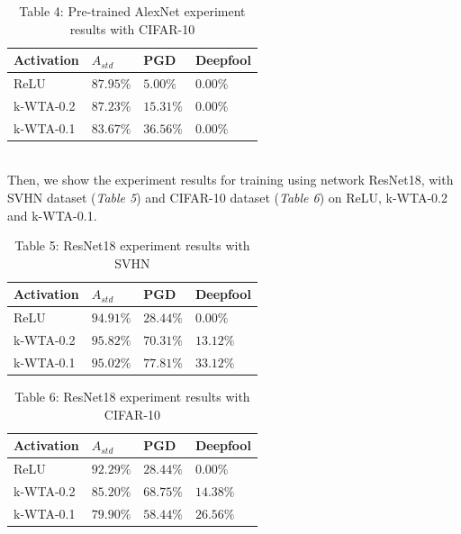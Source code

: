 \documentclass[a4paper]{article}
\begin{document}
	\begin{table}[!htbp]
		\begin{tabular}{|p{}|p{}|p{}|p{}|}
			\hline
			Activation	& $A_{std}$	&	PGD	&	Deepfool	\\
			\hline
			ReLU		&$87.95\%$&$5.00\%$&$0.00\%$	\\
			\hline
			k-WTA-0.2	&$87.23\%$&$15.31\%$&$0.00\%$	\\
			\hline
			k-WTA-0.1	&$83.67\%$&$36.56\%$&$0.00\%$	\\
			\hline
		\end{tabular}
		\caption{Table 4: Pre-trained AlexNet experiment results with CIFAR-10}\label{pre-alexnetCIFAR10}
	\end{table}\\
	Then, we show the experiment results for training using network ResNet18, with SVHN dataset (\textit{Table 5}) and CIFAR-10 dataset (\textit{Table 6}) on ReLU, k-WTA-0.2 and k-WTA-0.1.
	\begin{table}[!htbp]
		\begin{tabular}{|p{}|p{}|p{}|p{}|}
			\hline
			Activation	& $A_{std}$	&	PGD	&	Deepfool	\\
			\hline
			ReLU		&$94.91\%$&$28.44\%$&$0.00\%$	\\
			\hline
			k-WTA-0.2	&$95.82\%$&$70.31\%$&$13.12\%$	\\
			\hline
			k-WTA-0.1	&$95.02\%$&$77.81\%$&$33.12\%$	\\
			\hline
		\end{tabular}
		\caption{Table 5: ResNet18 experiment results with SVHN}\label{resnetSVHN}
	\end{table}
	\begin{table}[!htbp]
		\begin{tabular}{|p{}|p{}|p{}|p{}|}
			\hline
			Activation	& $A_{std}$	&	PGD	&	Deepfool	\\
			\hline
			ReLU		&$92.29\%$&$28.44\%$&$0.00\%$	\\
			\hline
			k-WTA-0.2	&$85.20\%$&$68.75\%$&$14.38\%$	\\
			\hline
			k-WTA-0.1	&$79.90\%$&$58.44\%$&$26.56\%$	\\
			\hline
		\end{tabular}
		\caption{Table 6: ResNet18 experiment results with CIFAR-10}\label{resnetCIFAR10}
	\end{table}\\
\end{document}
